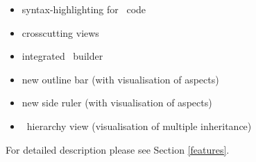 \begin{itemize}
	\item syntax-highlighting for \caesarj ~code
	\item crosscutting views
	\item integrated \caesarj ~builder
	\item new outline bar (with visualisation of aspects)
	\item new side ruler (with visualisation of aspects)
	\item \caesarj ~hierarchy view (visualisation of multiple inheritance)
\end{itemize}

For detailed description please see Section \ref{features}.
